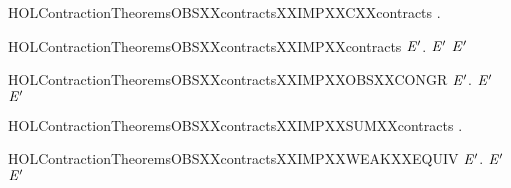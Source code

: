 \newcommand{\HOLContractionTheoremsOBSXXcontractsXXEPSYY}{\UseVerbatim{HOLContractionTheoremsOBSXXcontractsXXEPSYY}}
\begin{SaveVerbatim}{HOLContractionTheoremsOBSXXcontractsXXIMPXXCXXcontracts}
\HOLTokenTurnstile{} \HOLSymConst{\HOLTokenForall{}} .    \HOLSymConst{\HOLTokenImp{}}   
\end{SaveVerbatim}
\newcommand{\HOLContractionTheoremsOBSXXcontractsXXIMPXXCXXcontracts}{\UseVerbatim{HOLContractionTheoremsOBSXXcontractsXXIMPXXCXXcontracts}}
\begin{SaveVerbatim}{HOLContractionTheoremsOBSXXcontractsXXIMPXXcontracts}
\HOLTokenTurnstile{} \HOLSymConst{\HOLTokenForall{}} \ensuremath{\HOLBoundVar{E}\sp{\prime{}}}.   \ensuremath{\HOLBoundVar{E}\sp{\prime{}}} \HOLSymConst{\HOLTokenImp{}}   \ensuremath{\HOLBoundVar{E}\sp{\prime{}}}
\end{SaveVerbatim}
\newcommand{\HOLContractionTheoremsOBSXXcontractsXXIMPXXcontracts}{\UseVerbatim{HOLContractionTheoremsOBSXXcontractsXXIMPXXcontracts}}
\begin{SaveVerbatim}{HOLContractionTheoremsOBSXXcontractsXXIMPXXOBSXXCONGR}
\HOLTokenTurnstile{} \HOLSymConst{\HOLTokenForall{}} \ensuremath{\HOLBoundVar{E}\sp{\prime{}}}.   \ensuremath{\HOLBoundVar{E}\sp{\prime{}}} \HOLSymConst{\HOLTokenImp{}}   \ensuremath{\HOLBoundVar{E}\sp{\prime{}}}
\end{SaveVerbatim}
\newcommand{\HOLContractionTheoremsOBSXXcontractsXXIMPXXOBSXXCONGR}{\UseVerbatim{HOLContractionTheoremsOBSXXcontractsXXIMPXXOBSXXCONGR}}
\begin{SaveVerbatim}{HOLContractionTheoremsOBSXXcontractsXXIMPXXSUMXXcontracts}
\HOLTokenTurnstile{} \HOLSymConst{\HOLTokenForall{}} .    \HOLSymConst{\HOLTokenImp{}}   
\end{SaveVerbatim}
\newcommand{\HOLContractionTheoremsOBSXXcontractsXXIMPXXSUMXXcontracts}{\UseVerbatim{HOLContractionTheoremsOBSXXcontractsXXIMPXXSUMXXcontracts}}
\begin{SaveVerbatim}{HOLContractionTheoremsOBSXXcontractsXXIMPXXWEAKXXEQUIV}
\HOLTokenTurnstile{} \HOLSymConst{\HOLTokenForall{}} \ensuremath{\HOLBoundVar{E}\sp{\prime{}}}.   \ensuremath{\HOLBoundVar{E}\sp{\prime{}}} \HOLSymConst{\HOLTokenImp{}}   \ensuremath{\HOLBoundVar{E}\sp{\prime{}}}
\end{SaveVerbatim}
